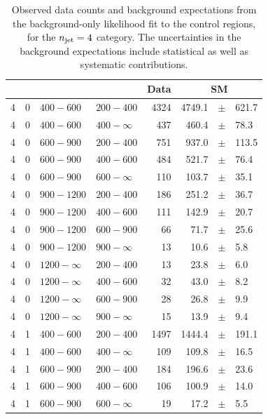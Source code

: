 \clearpage
\begin{table}[!h]
	\caption{
		Observed data counts and background expectations from the 
		background-only likelihood fit to the control regions, for the 
		$n_{\text{jet}}=4$ category. The uncertainties in the background expectations 
		include statistical as well as systematic contributions. 
	}
	\label{tab:cronly_sr_result-eq4j}
	\scriptsize
	\centering
	\begin{tabular}{rrllrrcl}
		\hline
		\njet\T\B & \nb & \scalht [GeV] & \mht [GeV] & Data & 
		\multicolumn{3}{c}{SM} \\ 
		\hline
		4\T & 0 & $ 400- 600$ & $200-400$ &   4324 &   4749.1 &$\pm$&  621.7 \\
		4 & 0 & $ 400- 600$ & $400-\infty$ &    437 &    460.4 &$\pm$&   78.3 \\
		4\T & 0 & $ 600- 900$ & $200-400$ &    751 &    937.0 &$\pm$&  113.5 \\
		4 & 0 & $ 600- 900$ & $400-600$ &    484 &    521.7 &$\pm$&   76.4 \\
		4 & 0 & $ 600- 900$ & $600-\infty$ &    110 &    103.7 &$\pm$&   35.1 \\
		4\T & 0 & $ 900-1200$ & $200-400$ &    186 &    251.2 &$\pm$&   36.7 \\
		4 & 0 & $ 900-1200$ & $400-600$ &    111 &    142.9 &$\pm$&   20.7 \\
		4 & 0 & $ 900-1200$ & $600-900$ &     66 &     71.7 &$\pm$&   25.6 \\
		4 & 0 & $ 900-1200$ & $900-\infty$ &     13 &     10.6 &$\pm$&    5.8 \\
		4\T & 0 & $1200- \infty$ & $200-400$ &     13 &     23.8 &$\pm$&    6.0 
		\\
		4 & 0 & $1200- \infty$ & $400-600$ &     32 &     43.0 &$\pm$&    8.2 \\
		4 & 0 & $1200- \infty$ & $600-900$ &     28 &     26.8 &$\pm$&    9.9 \\
		4 & 0 & $1200- \infty$ & $900-\infty$ &     15 &     13.9 &$\pm$&    
		9.4 \\
		4\T & 1 & $ 400- 600$ & $200-400$ &   1497 &   1444.4 &$\pm$&  191.1 \\
		4 & 1 & $ 400- 600$ & $400-\infty$ &    109 &    109.8 &$\pm$&   16.5 \\
		4\T & 1 & $ 600- 900$ & $200-400$ &    184 &    196.6 &$\pm$&   23.6 \\
		4 & 1 & $ 600- 900$ & $400-600$ &    106 &    100.9 &$\pm$&   14.0 \\
		4 & 1 & $ 600- 900$ & $600-\infty$ &     19 &     17.2 &$\pm$&    5.5 \\

\end{tabular}
\end{table}
